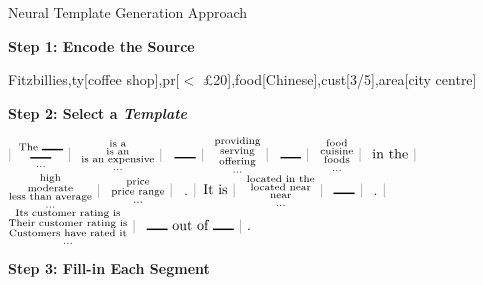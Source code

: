 \begin{frame}{Neural Template Generation Approach}

\textbf{Step 1: Encode the Source}

\begin{small}
Fitzbillies,ty[coffee shop],pr[$<$ \pounds 20],food[Chinese],cust[3/5],area[city centre]
\end{small}

\pause
\air
\textbf{Step 2: Select a \textit{Template}}

    \begin{center}

$\textcolor{gray}{|} $ $ \substack{\text{The \rule{15pt}{1pt}}\\\text{\rule{15pt}{1pt}}\\ \dots}
\ \textcolor{gray}{|} \  $ $ \substack{\text{is a}\\\text{is an}\\\text{is an expensive}\\ \dots}
\ \textcolor{gray}{|} \  $ $ \text{\rule{15pt}{1pt}} \ \textcolor{gray}{|} \  $ $ \substack{\text{providing}\\\text{serving}\\\text{offering}\\ \dots}
\ \textcolor{gray}{|} \  $ $ \text{\rule{15pt}{1pt}} \ \textcolor{gray}{|} \  $ $ \substack{\text{food}\\\text{cuisine}\\\text{foods}\\ \dots}
\ \textcolor{gray}{|} \  $ $ \text{in the} \ \textcolor{gray}{|} \  $ $ \substack{\text{high}\\\text{moderate}\\\text{less than average}\\ \dots}
\ \textcolor{gray}{|} \  $ $ \substack{\text{price}\\\text{price range}\\ \dots}
\ \textcolor{gray}{|} \  $ $ \text{.}$ $\textcolor{gray}{|}$ $ \text{It is} \ \textcolor{gray}{|} \  $ $ \substack{\text{located in the}\\\text{located near}\\\text{near}\\ \dots}
\ \textcolor{gray}{|} \  $ $ \text{\rule{15pt}{1pt}} \ \textcolor{gray}{|} \  $ $ \text{.}$ $ \textcolor{gray}{|} \  $ $ \substack{\text{Its customer rating is}\\\text{Their customer rating is}\\\text{Customers have rated it}\\ \dots}
\ \textcolor{gray}{|} \  $ $ \text{\rule{15pt}{1pt} out of \rule{15pt}{1pt}} \ \textcolor{gray}{|} \  .$
    \end{center}
\pause
\air
\textbf{Step 3: Fill-in Each Segment}
    \air



\end{frame}
